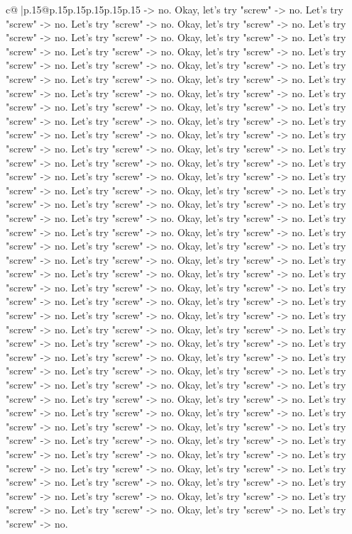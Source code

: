 \documentclass{article}
\begin{document}
{\begin{supertabular}{c@{$\;$}|p{.15\linewidth}@{}p{.15\linewidth}p{.15\linewidth}p{.15\linewidth}p{.15\linewidth}p{.15\linewidth}}
{{{{-}> no. Okay, let's try "screw" {-}> no. Let's try "screw" {-}> no. Let's try "screw" {-}> no. Okay, let's try "screw" {-}> no. Let's try "screw" {-}> no. Let's try "screw" {-}> no. Okay, let's try "screw" {-}> no. Let's try "screw" {-}> no. Let's try "screw" {-}> no. Okay, let's try "screw" {-}> no. Let's try "screw" {-}> no. Let's try "screw" {-}> no. Okay, let's try "screw" {-}> no. Let's try "screw" {-}> no. Let's try "screw" {-}> no. Okay, let's try "screw" {-}> no. Let's try "screw" {-}> no. Let's try "screw" {-}> no. Okay, let's try "screw" {-}> no. Let's try "screw" {-}> no. Let's try "screw" {-}> no. Okay, let's try "screw" {-}> no. Let's try "screw" {-}> no. Let's try "screw" {-}> no. Okay, let's try "screw" {-}> no. Let's try "screw" {-}> no. Let's try "screw" {-}> no. Okay, let's try "screw" {-}> no. Let's try "screw" {-}> no. Let's try "screw" {-}> no. Okay, let's try "screw" {-}> no. Let's try "screw" {-}> no. Let's try "screw" {-}> no. Okay, let's try "screw" {-}> no. Let's try "screw" {-}> no. Let's try "screw" {-}> no. Okay, let's try "screw" {-}> no. Let's try "screw" {-}> no. Let's try "screw" {-}> no. Okay, let's try "screw" {-}> no. Let's try "screw" {-}> no. Let's try "screw" {-}> no. Okay, let's try "screw" {-}> no. Let's try "screw" {-}> no. Let's try "screw" {-}> no. Okay, let's try "screw" {-}> no. Let's try "screw" {-}> no. Let's try "screw" {-}> no. Okay, let's try "screw" {-}> no. Let's try "screw" {-}> no. Let's try "screw" {-}> no. Okay, let's try "screw" {-}> no. Let's try "screw" {-}> no. Let's try "screw" {-}> no. Okay, let's try "screw" {-}> no. Let's try "screw" {-}> no. Let's try "screw" {-}> no. Okay, let's try "screw" {-}> no. Let's try "screw" {-}> no. Let's try "screw" {-}> no. Okay, let's try "screw" {-}> no. Let's try "screw" {-}> no. Let's try "screw" {-}> no. Okay, let's try "screw" {-}> no. Let's try "screw" {-}> no. Let's try "screw" {-}> no. Okay, let's try "screw" {-}> no. Let's try "screw" {-}> no. Let's try "screw" {-}> no. Okay, let's try "screw" {-}> no. Let's try "screw" {-}> no. Let's try "screw" {-}> no. Okay, let's try "screw" {-}> no. Let's try "screw" {-}> no. Let's try "screw" {-}> no. Okay, let's try "screw" {-}> no. Let's try "screw" {-}> no. Let's try "screw" {-}> no. Okay, let's try "screw" {-}> no. Let's try "screw" {-}> no. Let's try "screw" {-}> no. Okay, let's try "screw" {-}> no. Let's try "screw" {-}> no. Let's try "screw" {-}> no. Okay, let's try "screw" {-}> no. Let's try "screw" {-}> no. Let's try "screw" {-}> no. Okay, let's try "screw" {-}> no. Let's try "screw" {-}> no. Let's try "screw" {-}> no. Okay, let's try "screw" {-}> no. Let's try "screw" {-}> no. Let's try "screw" {-}> no. Okay, let's try "screw" {-}> no. Let's try "screw" {-}> no. Let's try "screw" {-}> no. Okay, let's try "screw" {-}> no. Let's try "screw" {-}> no. Let's try "screw" {-}> no. Okay, let's try "screw" {-}> no. Let's try "screw" {-}> no. Let's try "screw" {-}> no. Okay, let's try "screw" {-}> no. Let's try "screw" {-}> no. Let's try "screw" {-}> no. Okay, let's try "screw" {-}> no. Let's try "screw" {-}> no. Let's try "screw" {-}> no. Okay, let's try "screw" {-}> no. Let's try "screw" {-}> no. }}}
\end{supertabular}}
\end{document}
